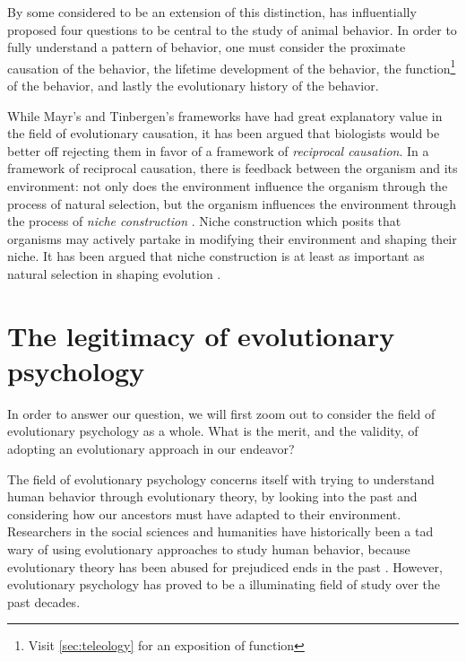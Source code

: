 By some considered to be an extension of this distinction, \cite{Tinbergen63} has influentially proposed four questions to be central to the study of animal behavior. In order to fully understand a pattern of behavior, one must consider the proximate causation of the behavior, the lifetime development of the behavior, the function\footnote{Visit \cref{sec:teleology} for an exposition of function} of the behavior, and lastly the evolutionary history of the behavior.

While Mayr's and Tinbergen's frameworks have had great explanatory value in the field of evolutionary causation, it has been argued \citep{Laland13} that biologists would be better off rejecting them in favor of a framework of \emph{reciprocal causation}.
In a framework of reciprocal causation, there is feedback between the organism and its environment: not only does the environment influence the organism through the process of natural selection, but the organism influences the environment through the process of \emph{niche construction} \citep{Svensson18}.
Niche construction which posits that organisms may actively partake in modifying their environment and shaping their niche. It has been argued that niche construction is at least as important as natural selection in shaping evolution \citep{Svensson18}.

\section{The legitimacy of evolutionary psychology}

In order to answer our question, we will first zoom out to consider the field of evolutionary psychology as a whole. What is the merit, and the validity, of adopting an evolutionary approach in our endeavor?

The field of evolutionary psychology concerns itself with trying to understand human behavior through evolutionary theory, by looking into the past and considering how our ancestors must have adapted to their environment.
Researchers in the social sciences and humanities have historically been a tad wary of using evolutionary approaches to study human behavior, because evolutionary theory has been abused for prejudiced ends in the past \citep[pp.~19--20]{LB02}. However, evolutionary psychology has proved to be a illuminating field of study over the past decades.

